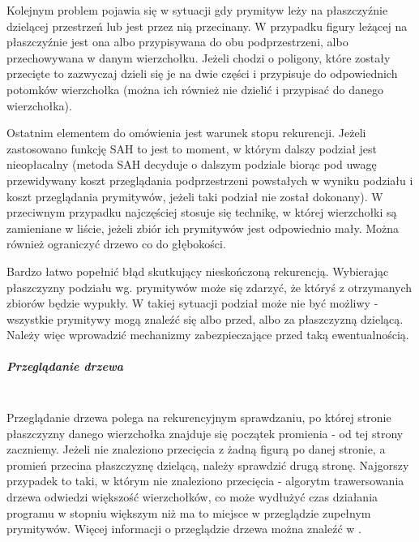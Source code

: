Kolejnym problem pojawia się w sytuacji gdy prymityw leży na płaszczyźnie dzielącej przestrzeń lub jest przez nią przecinany. W przypadku figury leżącej na płaszczyźnie jest ona albo przypisywana do obu podprzestrzeni, albo przechowywana w danym wierzchołku. Jeżeli chodzi o poligony, które zostały przecięte to zazwyczaj dzieli się je na dwie części i przypisuje do odpowiednich potomków wierzchołka (można ich również nie dzielić i przypisać do danego wierzchołka).

Ostatnim elementem do omówienia jest warunek stopu rekurencji. Jeżeli zastosowano funkcję SAH to jest to moment, w którym dalszy podział jest nieopłacalny (metoda SAH decyduje o dalszym podziale biorąc pod uwagę przewidywany koszt przeglądania podprzestrzeni powstałych w wyniku podziału i koszt przeglądania prymitywów, jeżeli taki podział nie został dokonany). W przeciwnym przypadku najczęściej stosuje się technikę, w której wierzchołki są zamieniane w liście, jeżeli zbiór ich prymitywów jest odpowiednio mały. Można również ograniczyć drzewo co do głębokości. 

Bardzo łatwo popełnić błąd skutkujący nieskończoną rekurencją. Wybierając płaszczyzny podziału wg. prymitywów może się zdarzyć, że któryś z otrzymanych zbiorów będzie wypukły. W takiej sytuacji podział może nie być możliwy - wszystkie prymitywy mogą znaleźć się albo przed, albo za płaszczyzną dzielącą. Należy więc wprowadzić mechanizmy zabezpieczające przed taką ewentualnością.

\subparagraph{Przeglądanie drzewa}\mbox{} \\

Przeglądanie drzewa polega na rekurencyjnym sprawdzaniu, po której stronie płaszczyzny danego wierzchołka znajduje się początek promienia - od tej strony zaczniemy. Jeżeli nie znaleziono przecięcia z żadną figurą po danej stronie, a promień przecina płaszczyznę dzielącą, należy sprawdzić drugą stronę. Najgorszy przypadek to taki, w którym nie znaleziono przecięcia - algorytm trawersowania drzewa odwiedzi większość wierzchołków, co może wydłużyć czas działania programu w stopniu większym niż ma to miejsce w przeglądzie zupełnym prymitywów. Więcej informacji o przeglądzie drzewa można znaleźć w \cite{bspfaq, trees}.